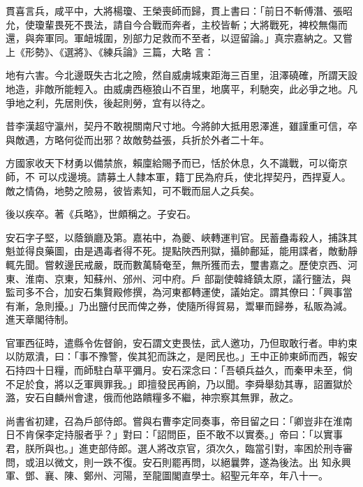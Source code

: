 \begin{pinyinscope}
 貫喜言兵，咸平中，大將楊瓊、王榮喪師而歸，貫上書曰：「前日不斬傅潛、張昭允，使瓊輩畏死不畏法，請自今合戰而奔者，主校皆斬；大將戰死，裨校無傷而還，與奔軍同。軍衄城圍，別部力足救而不至者，以逗留論。」真宗嘉納之。又嘗上《形勢》、《選將》、《練兵論》三篇，大略
 言：



 地有六害。今北邊既失古北之險，然自威虜城東距海三百里，沮澤磽確，所謂天設地造，非敵所能輕入。由威虜西極狼山不百里，地廣平，利馳突，此必爭之地。凡爭地之利，先居則佚，後起則勞，宜有以待之。



 昔李漢超守瀛州，契丹不敢視關南尺寸地。今將帥大抵用恩澤進，雖謹重可信，卒與敵遇，方略何從而出邪？故敵勢益張，兵折於外者二十年。



 方國家收天下材勇以備禁旅，賴廩給賜予而已，恬於休息，久不識戰，可以衛京師，不
 可以戍邊境。請募土人隸本軍，籍丁民為府兵，使北捍契丹，西捍夏人。敵之情偽，地勢之險易，彼皆素知，可不戰而屈人之兵矣。



 後以疾卒。著《兵略》，世頗稱之。子安石。



 安石字子堅，以蔭鎖廳及第。嘉祐中，為夔、峽轉運判官。民蓄蠱毒殺人，捕誅其魁並得良藥圖，由是遇毒者得不死。提點陜西刑獄，攝帥鄜延，能用諜者，敵動靜輒先聞。嘗敕邊民戒嚴，既而數萬騎奄至，無所獲而去，璽書嘉之。歷使京西、河東、淮南、京東，知蘇州、邠州、河中府。戶
 部副使韓絳鎮太原，議行鹽法，與監司多不合，加安石集賢殿修撰，為河東都轉運使，議始定。謂其僚曰：「興事當有漸，急則擾。」乃出鹽付民而俾之券，使隨所得貿易，鬻畢而歸券，私販為減。進天章閣待制。



 官軍西征時，遣縣令佐督餉，安石謂文吏畏怯，武人邀功，乃但取敢行者。申約束以防眾潰，曰：「事不豫警，俟其犯而誅之，是罔民也。」王中正帥東師而西，報安石持四十日糧，而師駐白草平彌月。安石深念曰：「吾頓兵益久，而秦甲未至，倘
 不足於食，將以乏軍興罪我。」即擅發民再餉，乃以聞。李舜舉劾其專，詔置獄於潞，安石自麟州會逮，俄而他路饋糧多不繼，神宗察其無罪，赦之。



 尚書省初建，召為戶部侍郎。嘗與右曹李定同奏事，帝目留之曰：「卿豈非在淮南日不肯保李定持服者乎？」對曰：「詔問臣，臣不敢不以實奏。」帝曰：「以實事君，朕所與也。」進吏部侍郎。選人將改京官，須次久，臨當引對，率困於刑寺審問，或沮以微文，則一跌不復。安石則罷再問，以絕曩弊，遂為後法。出
 知永興軍、鄧、襄、陳、鄭州、河陽，至龍圖閣直學士。紹聖元年卒，年八十一。




\end{pinyinscope}
